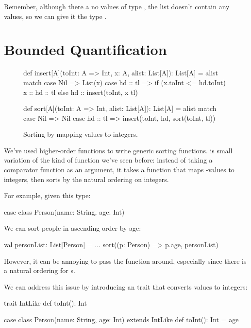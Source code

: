 \documentclass{book}
\begin{document}
Remember, although there a no values of type , the list 
doesn't contain any values, so we can give it the type .


\newlecture

\section{Bounded Quantification}

\begin{figure}
\begin{scalacode}
def insert[A](toInt: A => Int, x: A, alist: List[A]): List[A] = alist match {
  case Nil => List(x)
  case hd :: tl => {
    if (x.toInt <= hd.toInt) {
      x :: hd :: tl
    }
    else {
      hd :: insert(toInt, x tl)
    }
  }
}

def sort[A](toInt: A => Int, alist: List[A]): List[A] = alist match {
  case Nil => Nil
  case hd :: tl => insert(toInt, hd, sort(toInt, tl))
}
\end{scalacode}
\caption{Sorting by mapping values to integers.}
\label{sortToIntHOF}
\end{figure}

We've used higher-order functions to write generic sorting functions.
 is small variation of the kind of function we've
seen before: instead of taking a comparator function as an argument, it takes a
 function that maps
-values to integers, then sorts by the natural ordering
on integers.

For example, given this type:
\begin{scalacode}
case class Person(name: String, age: Int)
\end{scalacode}
We can sort people in ascending order by age:
\begin{scalacode}
val personList: List[Person] = ...
sort((p: Person) => p.age, personList)
\end{scalacode}

However, it can be annoying to pass the  function around,
especially since there is a natural ordering for s.

We can address this issue by introducing an  trait
that converts values to integers:

\begin{scalacode}
trait IntLike {
  def toInt(): Int
}

case class Person(name: String, age: Int) extends IntLike {
  def toInt(): Int = age
}
\end{scalacode}
\end{document}
